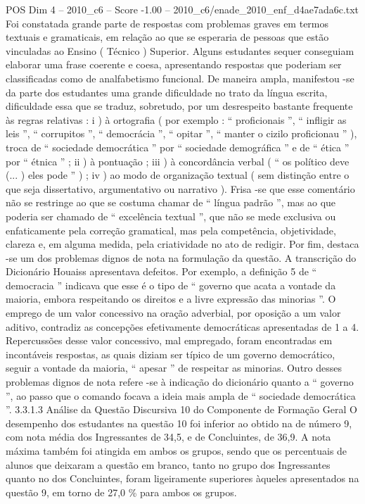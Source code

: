 \begin{textsample}{POS Dim 4 – 2010\_c6 – Score -1.00 – 2010\_c6/enade\_2010\_enf\_d4ae7ada6c.txt}
Foi constatada grande parte de respostas com problemas graves em termos textuais e gramaticais, em relação ao que se esperaria de pessoas que estão vinculadas ao Ensino ( Técnico ) Superior.
Alguns estudantes sequer conseguiam elaborar uma frase coerente e coesa, apresentando respostas que poderiam ser classificadas como de analfabetismo funcional.
De maneira ampla, manifestou -se da parte dos estudantes uma grande dificuldade no trato da língua escrita, dificuldade essa que se traduz, sobretudo, por um desrespeito bastante frequente às regras relativas : i ) à ortografia ( por exemplo : “ proficionais ”, “ infligir as leis ”, “ corrupitos ”, “ democrácia ”, “ opitar ”, “ manter o cizilo proficionau ” ), troca de “ sociedade democrática ” por “ sociedade demográfica ” e de “ ética ” por “ étnica ” ; ii ) à pontuação ; iii ) à concordância verbal ( “ os político deve (... ) eles pode ” ) ; iv ) ao modo de organização textual ( sem distinção entre o que seja dissertativo, argumentativo ou narrativo ).
Frisa -se que esse comentário não se restringe ao que se costuma chamar de “ língua padrão ”, mas ao que poderia ser chamado de “ excelência textual ”, que não se mede exclusiva ou enfaticamente pela correção gramatical, mas pela competência, objetividade, clareza e, em alguma medida, pela criatividade no ato de redigir.
Por fim, destaca -se um dos problemas dignos de nota na formulação da questão.
A transcrição do Dicionário Houaiss apresentava defeitos.
Por exemplo, a definição 5 de “ democracia ” indicava que esse é o tipo de “ governo que acata a vontade da maioria, embora respeitando os direitos e a livre expressão das minorias ”.
O emprego de um valor concessivo na oração adverbial, por oposição a um valor aditivo, contradiz as concepções efetivamente democráticas apresentadas de 1 a 4.
Repercussões desse valor concessivo, mal empregado, foram encontradas em incontáveis respostas, as quais diziam ser típico de um governo democrático, seguir a vontade da maioria, “ apesar ” de respeitar as minorias.
Outro desses problemas dignos de nota refere -se à indicação do dicionário quanto a “ governo ”, ao passo que o comando focava a ideia mais ampla de “ sociedade democrática ”. 3.3.1.3 Análise da Questão Discursiva 10 do Componente de Formação Geral O desempenho dos estudantes na questão 10 foi inferior ao obtido na de número 9, com nota média dos Ingressantes de 34,5, e de Concluintes, de 36,9.
A nota máxima também foi atingida em ambos os grupos, sendo que os percentuais de alunos que deixaram a questão em branco, tanto no grupo dos Ingressantes quanto no dos Concluintes, foram ligeiramente superiores àqueles apresentados na questão 9, em torno de 27,0 \% para ambos os grupos.

\end{textsample}
